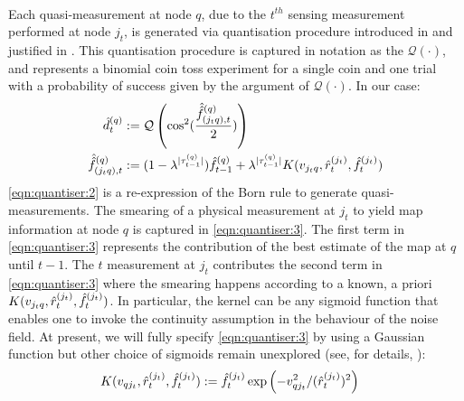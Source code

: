 \\
Each quasi-measurement at node $q$, due to the $t^{th}$ sensing measurement performed at node $j_t$, is generated via quantisation procedure introduced in \cite{riddhi_paper_1} and justified in \cite{riddhi_paper_2}. This quantisation procedure is captured in notation as the $\mathcal{Q}(\cdot)$, and represents a binomial coin toss experiment for a single coin and one trial with a probability of success given by the argument of $\mathcal{Q}(\cdot)$. In our case:
\\
\begin{align}
	\hat{d}^{( q )}_{t} & :=\mathcal{Q}\left( \cos^2(\frac{\hat{\hat{f}}^{(q)}_{(j_tq),t}}{2}) \label{eqn:physetting:quantiser:2} \right) \\
	\hat{\hat{f}}^{(q)}_{(j_tq),t} & :=  (1 - \lambda^{|\tau^{(q)}_{t-1}|})\hat{f}^{( q )}_{t-1} + \lambda^{|\tau^{(q)}_{t-1}|}K(v_{j_tq},\hat{r}^{( j_t )}_{t}, \hat{f}^{( j_t )}_{t}) \label{eqn:physetting:quantiser:3}
\end{align} \cref{eqn:quantiser:2} is a re-expression of the Born rule to generate quasi-measurements. The smearing of a physical measurement at $j_t$ to yield map information at node $q$ is captured in \cref{eqn:quantiser:3}. The first term in \cref{eqn:quantiser:3} represents the contribution of the best estimate of the map at $q$ until $t-1$. The $t$ measurement at $j_t$ contributes the second term in \cref{eqn:quantiser:3} where the smearing happens according to a known, a priori $K(v_{j_tq},\hat{r}^{( j_t )}_{t}, \hat{f}^{( j_t )}_{t})$. In particular,  the kernel can be any sigmoid function that enables one to invoke the continuity assumption in the behaviour of the noise field. At present, we will fully specify \cref{eqn:quantiser:3} by using  a Gaussian function but other choice of sigmoids remain unexplored (see, for details, \cite{ito1992approximation}):
\begin{align}
	K(v_{qj_t},\hat{r}^{( j_t )}_{t}, \hat{f}^{( j_t )}_{t}) &:= \hat{f}^{( j_t )}_{t}\exp\left(-v_{qj_t}^2 / (\hat{r}^{( j_t )}_{t})^2 \right)  \label{eqn:physetting:kernel}
\end{align} \\
